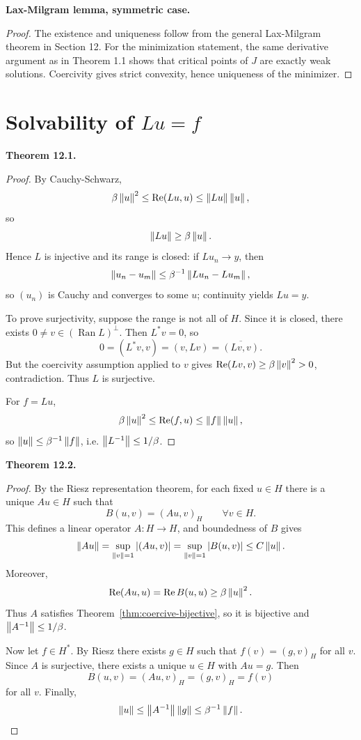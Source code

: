 \documentclass[11pt]{article}
\newenvironment{theoremstmt}[1]{%
  \par\medskip\noindent\textbf{Theorem #1. }\itshape
}{\par\medskip}
\newenvironment{namedstmt}[1]{%
  \par\medskip\noindent\textbf{#1. }\itshape
}{\par\medskip}
\begin{document}
\begin{namedstmt}{Lax-Milgram lemma, symmetric case}
\thmLaxMilgramSymmetric
\end{namedstmt}

\begin{proof}
The existence and uniqueness follow from the general Lax-Milgram theorem in Section 12. For the minimization statement, the same derivative argument as in Theorem 1.1 shows that critical points of $J$ are exactly weak solutions. Coercivity gives strict convexity, hence uniqueness of the minimizer.
\end{proof}

\section{Solvability of \texorpdfstring{$Lu=f$}{Lu=f}}

\begin{theoremstmt}{12.1}
\thmCoerciveBijective
\end{theoremstmt}

\begin{proof}
By Cauchy-Schwarz,
\[
\beta\left\lVert u\right\rVert^2\le \operatorname{Re}(Lu,u)\le \left\lVert Lu\right\rVert\left\lVert u\right\rVert,
\]
so
\[
\left\lVert Lu\right\rVert\ge \beta\left\lVert u\right\rVert.
\]
Hence $L$ is injective and its range is closed: if $Lu_n\to y$, then
\[
\left\lVert u_n-u_m\right\rVert\le \beta^{-1}\left\lVert Lu_n-Lu_m\right\rVert,
\]
so $(u_n)$ is Cauchy and converges to some $u$; continuity yields $Lu=y$.

To prove surjectivity, suppose the range is not all of $H$. Since it is closed, there exists $0\neq v\in (\operatorname{Ran}L)^{\perp}$. Then $L^*v=0$, so
\[
0=(L^*v,v)=(v,Lv)=\overline{(Lv,v)}.
\]
But the coercivity assumption applied to $v$ gives $\operatorname{Re}(Lv,v)\ge \beta\left\lVert v\right\rVert^2>0$, contradiction. Thus $L$ is surjective.

For $f=Lu$,
\[
\beta\left\lVert u\right\rVert^2\le \operatorname{Re}(f,u)\le \left\lVert f\right\rVert\left\lVert u\right\rVert,
\]
so $\left\lVert u\right\rVert\le \beta^{-1}\left\lVert f\right\rVert$, i.e. $\left\lVert L^{-1}\right\rVert\le 1/\beta$.
\end{proof}

\begin{theoremstmt}{12.2}
\thmLaxMilgramGeneral
\end{theoremstmt}

\begin{proof}
By the Riesz representation theorem, for each fixed $u\in H$ there is a unique $Au\in H$ such that
\[
B(u,v)=(Au,v)_H \qquad \forall v\in H.
\]
This defines a linear operator $A:H\to H$, and boundedness of $B$ gives
\[
\left\lVert Au\right\rVert=\sup_{\left\lVert v\right\rVert=1}\left\lvert (Au,v)\right\rvert=
\sup_{\left\lVert v\right\rVert=1}\left\lvert B(u,v)\right\rvert\le C\left\lVert u\right\rVert.
\]
Moreover,
\[
\operatorname{Re}(Au,u)=\operatorname{Re}B(u,u)\ge \beta\left\lVert u\right\rVert^2.
\]
Thus $A$ satisfies Theorem~\ref{thm:coercive-bijective}, so it is bijective and $\left\lVert A^{-1}\right\rVert\le 1/\beta$.

Now let $f\in H^*$. By Riesz there exists $g\in H$ such that $f(v)=(g,v)_H$ for all $v$. Since $A$ is surjective, there exists a unique $u\in H$ with $Au=g$. Then
\[
B(u,v)=(Au,v)_H=(g,v)_H=f(v)
\]
for all $v$. Finally,
\[
\left\lVert u\right\rVert\le \left\lVert A^{-1}\right\rVert\left\lVert g\right\rVert\le \beta^{-1}\left\lVert f\right\rVert.
\]
\end{proof}
\end{document}
